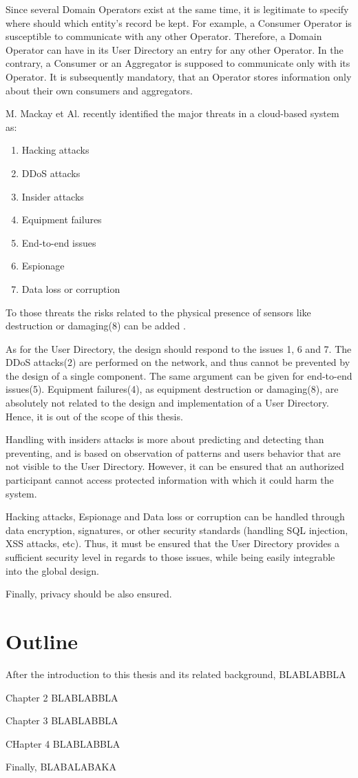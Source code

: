 Since several Domain Operators exist at the same time, it is legitimate to specify where should which entity's record be kept. For example, a Consumer Operator is susceptible to communicate with any other Operator. Therefore, a Domain Operator can have in its User Directory an entry for any other Operator. In the contrary, a Consumer or an Aggregator is supposed to communicate only with its Operator. It is subsequently mandatory, that an Operator stores information only about their own consumers and aggregators.

M. Mackay et Al. recently identified the major threats in a cloud-based system as\cite{Mackay2012}: 
\begin{enumerate}
	\item Hacking attacks
	\item DDoS attacks
	\item Insider attacks
	\item Equipment failures
	\item End-to-end issues
	\item Espionage
	\item Data loss or corruption
\end{enumerate}

To those threats the risks related to the physical presence of sensors like destruction or damaging(8) can be added .

As for the User Directory, the design should respond to the issues 1, 6 and 7. The DDoS attacks(2) are performed on the network, and thus cannot be prevented by the design of a single component. The same argument can be given for end-to-end issues(5). Equipment failures(4), as equipment destruction or damaging(8), are absolutely not related to the design and implementation of a User Directory. Hence, it is out of the scope of this thesis. 

Handling with insiders attacks is more about predicting and detecting than preventing, and is based on observation of patterns and users behavior that are not visible to the User Directory\cite{Schultz2002}. However, it can be ensured that an authorized participant cannot access protected information with which it could harm the system.

Hacking attacks, Espionage and Data loss or corruption can be handled through data encryption, signatures, or other security standards (handling SQL injection, XSS attacks, etc). Thus, it must be ensured that the User Directory provides a sufficient security level in regards to those issues, while being easily integrable into the global design. 

Finally, privacy should be also ensured.


\section{Outline}
After the introduction to this thesis and its related background, BLABLABBLA

Chapter 2 BLABLABBLA

Chapter 3 BLABLABBLA

CHapter 4 BLABLABBLA

Finally, BLABALABAKA



